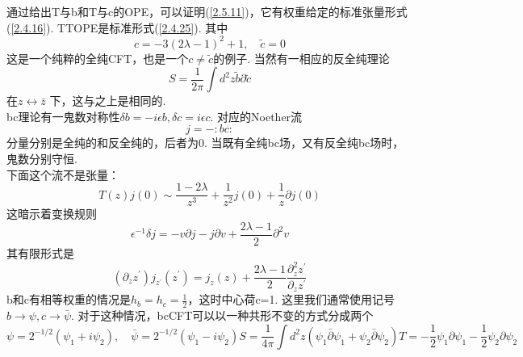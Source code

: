 通过给出T与b和T与c的OPE，可以证明(\ref{2.5.11})，它有权重给定的标准张量形式(\ref{2.4.16}). TTOPE是标准形式(\ref{2.4.25}). 其中
\begin{equation}
c=-3(2 \lambda-1)^{2}+1, \quad \tilde{c}=0
\end{equation}
这是一个纯粹的全纯CFT，也是一个$c \neq \tilde{c}$的例子. 当然有一相应的反全纯理论
\begin{equation}
S=\frac{1}{2 \pi} \int d^{2} z \tilde{b} \partial \tilde{c}
\end{equation}
在$z \leftrightarrow \bar{z}$ 下，这与之上是相同的.\\
bc理论有一鬼数对称性$\delta b=-i \epsilon b, \delta c=i \epsilon c$. 对应的Noether流
\begin{equation}\label{2.5.14}
j=-: b c:
\end{equation}
分量分别是全纯的和反全纯的，后者为0. 当既有全纯bc场，又有反全纯bc场时，鬼数分别守恒. \\
下面这个流不是张量：
\begin{equation}
T(z) j(0) \sim \frac{1-2 \lambda}{z^{3}}+\frac{1}{z^{2}} j(0)+\frac{1}{z} \partial j(0)
\end{equation}
这暗示着变换规则
\begin{equation}
\epsilon^{-1} \delta j=-v \partial j-j \partial v+\frac{2 \lambda-1}{2} \partial^{2} v
\end{equation}
其有限形式是
\begin{equation}\label{2.5.17}
\left(\partial_{z} z^{\prime}\right) j_{z^{\prime}}\left(z^{\prime}\right)=j_{z}(z)+\frac{2 \lambda-1}{2} \frac{\partial_{z}^{2} z^{\prime}}{\partial_{z} z^{\prime}}
\end{equation}
b和c有相等权重的情况是$h_{b}=h_{c}=\frac{1}{2}$，这时中心荷c=1. 这里我们通常使用记号$b\to \psi,c \to  \bar{\psi}$. 对于这种情况，bcCFT可以以一种共形不变的方式分成两个
\begin{subequations}
\begin{equation}
\psi=2^{-1 / 2}\left(\psi_{1}+i \psi_{2}\right), \quad \bar{\psi}=2^{-1 / 2}\left(\psi_{1}-i \psi_{2}\right)
\end{equation}
\begin{equation}
S=\frac{1}{4 \pi} \int d^{2} z\left(\psi_{1} \bar{\partial} \psi_{1}+\psi_{2} \bar{\partial} \psi_{2}\right)
\end{equation}
\begin{equation}
T=-\frac{1}{2} \psi_{1} \partial \psi_{1}-\frac{1}{2} \psi_{2} \partial \psi_{2}
\end{equation}
\end{subequations}
